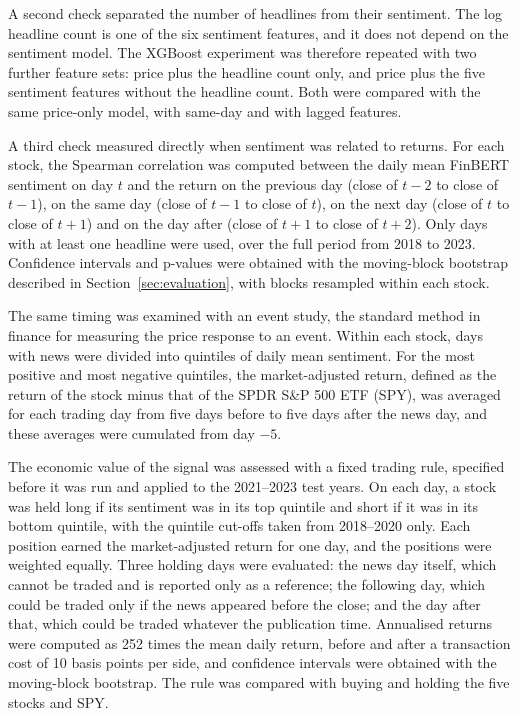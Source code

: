 A second check separated the number of headlines from their sentiment. The log headline count is one of the six sentiment features, and it does not depend on the sentiment model. The XGBoost experiment was therefore repeated with two further feature sets: price plus the headline count only, and price plus the five sentiment features without the headline count. Both were compared with the same price-only model, with same-day and with lagged features.

A third check measured directly when sentiment was related to returns. For each stock, the Spearman correlation was computed between the daily mean FinBERT sentiment on day $t$ and the return on the previous day (close of $t-2$ to close of $t-1$), on the same day (close of $t-1$ to close of $t$), on the next day (close of $t$ to close of $t+1$) and on the day after (close of $t+1$ to close of $t+2$). Only days with at least one headline were used, over the full period from 2018 to 2023. Confidence intervals and p-values were obtained with the moving-block bootstrap described in Section~\ref{sec:evaluation}, with blocks resampled within each stock.

The same timing was examined with an event study, the standard method in finance for measuring the price response to an event. Within each stock, days with news were divided into quintiles of daily mean sentiment. For the most positive and most negative quintiles, the market-adjusted return, defined as the return of the stock minus that of the SPDR S\&P 500 ETF (SPY), was averaged for each trading day from five days before to five days after the news day, and these averages were cumulated from day $-5$.

The economic value of the signal was assessed with a fixed trading rule, specified before it was run and applied to the 2021--2023 test years. On each day, a stock was held long if its sentiment was in its top quintile and short if it was in its bottom quintile, with the quintile cut-offs taken from 2018--2020 only. Each position earned the market-adjusted return for one day, and the positions were weighted equally. Three holding days were evaluated: the news day itself, which cannot be traded and is reported only as a reference; the following day, which could be traded only if the news appeared before the close; and the day after that, which could be traded whatever the publication time. Annualised returns were computed as 252 times the mean daily return, before and after a transaction cost of 10 basis points per side, and confidence intervals were obtained with the moving-block bootstrap. The rule was compared with buying and holding the five stocks and SPY.


